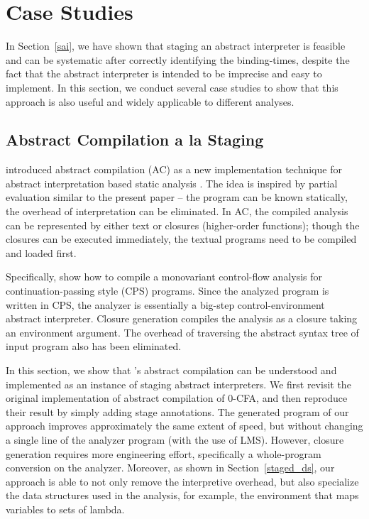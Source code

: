 \section{Case Studies} \label{cases_study}

In Section~\ref{sai}, we have shown that staging an abstract interpreter is
feasible and can be systematic after correctly identifying the binding-times,
despite the fact that the abstract interpreter is intended to be imprecise and
easy to implement. In this section, we conduct several case studies to show that
this approach is also useful and widely applicable to different analyses.

\subsection{Abstract Compilation a la Staging} \label{cs_ac}

\citeauthor{Boucher:1996:ACN:647473.727587} introduced abstract compilation (AC)
as a new implementation technique for abstract interpretation based static
analysis \cite{Boucher:1996:ACN:647473.727587}. The idea is inspired by partial
evaluation similar to the present paper -- the program can be known statically,
the overhead of interpretation can be eliminated. In AC, the compiled analysis
can be represented by either text or closures (higher-order functions); though
the closures can be executed immediately, the textual programs need to be
compiled and loaded first.

Specifically, \citeauthor{Boucher:1996:ACN:647473.727587} show how to compile a
monovariant control-flow analysis \cite{Shivers:1991:SSC:115865.115884,
Shivers:1988:CFA:53990.54007} for continuation-passing style (CPS) programs.
Since the analyzed program is written in CPS, the analyzer is essentially a
big-step control-environment abstract interpreter. Closure generation compiles
the analysis as a closure taking an environment argument. The overhead of
traversing the abstract syntax tree of input program also has been eliminated.

In this section, we show that \citeauthor{Boucher:1996:ACN:647473.727587}'s
abstract compilation can be understood and implemented as an instance of staging
abstract interpreters. We first revisit the original implementation of abstract
compilation of 0-CFA, and then reproduce their result by simply adding stage
annotations. The generated program of our approach improves approximately the
same extent of speed, but without changing a single line of the analyzer program
(with the use of LMS). However, closure generation requires more engineering
effort, specifically a whole-program conversion on the analyzer. Moreover, as
shown in Section~\ref{staged_ds}, our approach is able to not only remove the
interpretive overhead, but also specialize the data structures used in the
analysis, for example, the environment that maps variables to sets of lambda.

